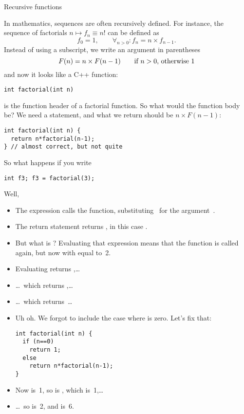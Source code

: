 {Recursive functions}
\label{sec:recursion}

In mathematics, sequences are often recursively defined. For instance,
the sequence of factorials $n\mapsto f_n\equiv n!$ can be defined as
\[ f_0=1,\qquad \forall_{n>0}\colon f_n=n\times f_{n-1}. \]
Instead of using a subscript, we write an argument in parentheses
\[ F(n) = n \times F(n-1) \qquad \hbox{if $n>0$, otherwise~$1$} \]
and now it looks like a C++ function:
\begin{verbatim}
int factorial(int n)
\end{verbatim}
is the function header of a factorial function. So what would the
function body be? We need a  statement, and what we return
should be $n \times F(n-1)$:
\begin{verbatim}
int factorial(int n) {
  return n*factorial(n-1);
} // almost correct, but not quite
\end{verbatim}
So what happens if you write
\begin{verbatim}
int f3; f3 = factorial(3);
\end{verbatim}
Well,
\begin{itemize}
\item The expression  calls the 
  function, substituting~ for the argument~.
\item The return statement returns , in this case
  .
\item But what is ? Evaluating that expression means
  that the  function is called again, but now with 
  equal to~2.
\item Evaluating  returns ,\ldots
\item \ldots~which returns ,\ldots
\item \ldots~which returns~\ldots
\item Uh oh. We forgot to include the case where  is zero. Let's
  fix that:
\begin{verbatim}
int factorial(int n) {
  if (n==0)
    return 1;
  else
    return n*factorial(n-1);
}
\end{verbatim}
\item Now  is~1, so  is
  , which is~1,\ldots
\item \ldots~so  is~2, and  is~6.
\end{itemize}

